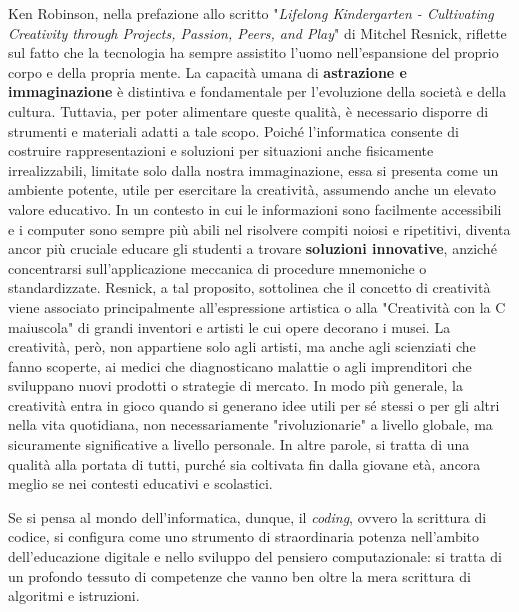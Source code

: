 Ken Robinson, nella prefazione allo scritto "\textit{Lifelong Kindergarten - Cultivating Creativity through Projects, Passion, Peers, and Play}" di Mitchel Resnick,
riflette sul fatto che la tecnologia ha sempre assistito l'uomo nell'espansione del proprio corpo e della propria mente.
La capacità umana di \textbf{astrazione e immaginazione} è distintiva e fondamentale per l'evoluzione della società e della cultura. 
Tuttavia, per poter alimentare queste qualità, è necessario disporre di strumenti e materiali 
adatti a tale scopo. Poiché l'informatica consente di costruire rappresentazioni e soluzioni per situazioni anche fisicamente irrealizzabili, limitate solo dalla nostra immaginazione, essa si presenta
come un ambiente potente, utile per esercitare la creatività, assumendo anche un elevato valore educativo. In un contesto in cui le informazioni sono facilmente accessibili e i computer sono sempre più 
abili nel risolvere compiti noiosi e ripetitivi, diventa ancor più cruciale educare gli studenti a trovare \textbf{soluzioni innovative}, anziché concentrarsi sull'applicazione meccanica di procedure 
mnemoniche o standardizzate.
Resnick, a tal proposito, sottolinea che il concetto di creatività viene associato principalmente all'espressione artistica o alla "Creatività con la C maiuscola" di grandi inventori e artisti le
cui opere decorano i musei. La creatività, però, non appartiene solo agli artisti, ma anche agli scienziati che fanno scoperte, ai medici che diagnosticano malattie o agli imprenditori che sviluppano nuovi prodotti 
o strategie di mercato. In modo più generale, la creatività entra in gioco quando si generano idee utili per sé stessi o per gli altri nella vita quotidiana, non necessariamente "rivoluzionarie" a livello
globale, ma sicuramente significative a livello personale. In altre parole, si tratta di una qualità alla portata di tutti, purché sia coltivata fin dalla giovane 
età, ancora meglio se nei contesti educativi e scolastici.

Se si pensa al mondo dell'informatica, dunque, il \textit{coding}, ovvero la scrittura di codice, si configura come uno strumento di straordinaria potenza
nell'ambito dell'educazione digitale e nello sviluppo del pensiero computazionale: si tratta di un profondo tessuto
di competenze che vanno ben oltre la mera scrittura di algoritmi e istruzioni.

